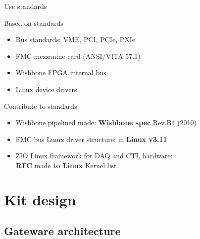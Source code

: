 \documentclass[compress,red]{beamer}
\begin{document}
\begin{frame}{Use standards}

  \begin{block}{Based on standards}
    \begin{itemize}
    \item Bus standards: VME, PCI, PCIe, PXIe
    \item FMC mezzanine card (ANSI/VITA 57.1)
    \item Wishbone FPGA internal bus
    \item Linux device drivers
    \end{itemize}
  \end{block}

  \begin{block}{Contribute to standards}
    \begin{itemize}
    \item Wishbone pipelined mode: \textbf{Wishbone spec} Rev.B4 (2010)
    \item FMC bus Linux driver structure: in \textbf{Linux v3.11}
    \item ZIO Linux framework for DAQ and CTL hardware: \\ \textbf{RFC} made \textbf{to Linux} Kernel list
    \end{itemize}
  \end{block}

\end{frame}


\section{Kit design}


\subsection{Gateware architecture}
\end{document}
